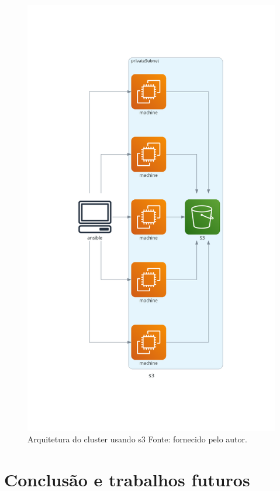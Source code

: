 \documentclass[article,a4paper,12pt,brazil,sumario=tradicional]{abntex2}
\begin{document}
\begin{figure}[htb]
	\centering
	\includegraphics[width=1\textwidth]{s3.png}
	\caption{Arquitetura do cluster usando s3 Fonte: fornecido pelo autor.}
	\label{fig:s3}
\end{figure}

\section{Conclusão e trabalhos futuros}


\newpage

\end{document}

